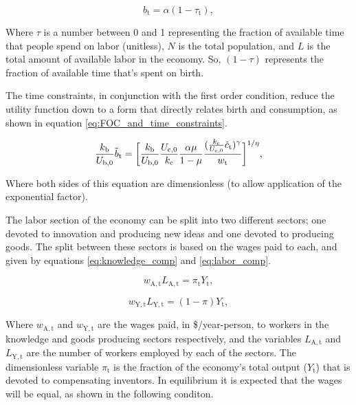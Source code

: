 \documentclass[letterpaper,12pt]{article}
\begin{document}
\begin{equation} \label{eq:birth_constraint}
b_\mathrm{t} = \alpha (1-\tau_\mathrm{t}),
\end{equation}

Where $\tau$ is a number between 0 and 1 representing the fraction of available time that people spend on labor (unitless), $N$ is the total population, and $L$ is the total amount of available labor in the economy. So, $(1-\tau)$ represents the fraction of available time that's spent on birth.

The time constraints, in conjunction with the first order condition, reduce the utility function down to a form that directly relates birth and consumption, as shown in equation \ref{eq:FOC_and_time_constraints}.

\begin{equation} \label{eq:FOC_and_time_constraints}
\frac{k_\mathrm{b}}{U_\mathrm{b,0}} \tilde b_\mathrm{t} = \bigg{[} \frac{k_\mathrm{b}}{U_\mathrm{b,0}} \frac{U_\mathrm{c,0}}{k_\mathrm{c}} \frac{\alpha \mu}{1-\mu} \frac{( \frac{k_\mathrm{c}}{U_\mathrm{c,0}} \tilde c_\mathrm{t} )^\gamma}{w_\mathrm{t}}\bigg{]}^{1/\eta} ,
\end{equation}

Where both sides of this equation are dimensionless (to allow application of the exponential factor).

The labor section of the economy can be split into two different sectors; one devoted to innovation and producing new ideas and one devoted to producing goods. The split between these sectors is based on the wages paid to each, and given by equations \ref{eq:knowledge_comp} and \ref{eq:labor_comp}.

\begin{equation} \label{eq:knowledge_comp}
w_\mathrm{A,t} L_\mathrm{A,t} = \pi_\mathrm{t} Y_\mathrm{t},
\end{equation}

\begin{equation} \label{eq:labor_comp}
w_\mathrm{Y,t} L_\mathrm{Y,t} = (1-\pi) Y_\mathrm{t},
\end{equation}

Where $w_\mathrm{A,t}$ and $w_\mathrm{Y,t}$ are the wages paid, in \$/year-person, to workers in the knowledge and goods producing sectors respectively, and the variables $L_\mathrm{A,t}$ and $L_\mathrm{Y,t}$ are the number of workers employed by each of the sectors. The dimensionless variable $\pi_\mathrm{t}$ is the fraction of the economy's total output ($Y_\mathrm{t}$) that is devoted to compensating inventors. In equilibrium it is expected that the wages will be equal, as shown in the following conditon.
\end{document}
